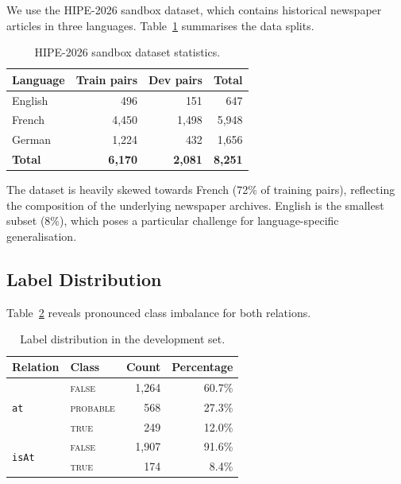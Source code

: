 \documentclass[runningheads]{llncs}
\begin{document}
We use the HIPE-2026 sandbox dataset, which contains historical newspaper articles in three languages. Table~\ref{tab:dataset} summarises the data splits.

\begin{table}[t]
\centering
\caption{HIPE-2026 sandbox dataset statistics.}
\label{tab:dataset}
\begin{tabular}{lrrr}
\toprule
\textbf{Language} & \textbf{Train pairs} & \textbf{Dev pairs} & \textbf{Total} \\
\midrule
English & 496 & 151 & 647 \\
French & 4{,}450 & 1{,}498 & 5{,}948 \\
German & 1{,}224 & 432 & 1{,}656 \\
\midrule
\textbf{Total} & \textbf{6{,}170} & \textbf{2{,}081} & \textbf{8{,}251} \\
\bottomrule
\end{tabular}
\end{table}

The dataset is heavily skewed towards French (72\% of training pairs), reflecting the composition of the underlying newspaper archives. English is the smallest subset (8\%), which poses a particular challenge for language-specific generalisation.

\subsection{Label Distribution}

Table~\ref{tab:labels} reveals pronounced class imbalance for both relations.

\begin{table}[t]
\centering
\caption{Label distribution in the development set.}
\label{tab:labels}
\begin{tabular}{llrr}
\toprule
\textbf{Relation} & \textbf{Class} & \textbf{Count} & \textbf{Percentage} \\
\midrule
\multirow{3}{*}{\texttt{at}} & \textsc{false} & 1{,}264 & 60.7\% \\
 & \textsc{probable} & 568 & 27.3\% \\
 & \textsc{true} & 249 & 12.0\% \\
\midrule
\multirow{2}{*}{\texttt{isAt}} & \textsc{false} & 1{,}907 & 91.6\% \\
 & \textsc{true} & 174 & 8.4\% \\
\bottomrule
\end{tabular}
\end{table}
\end{document}
